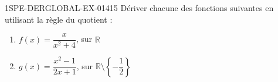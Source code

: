 \begin{exercice}{1SPE-DERGLOBAL-EX-014}{1}{5}
Dériver chacune des fonctions suivantes en utilisant la règle du quotient :
\begin{enumerate}
  \item $f(x) = \dfrac{x}{x^2+4}$, sur $\mathbb{R}$
  \item $g(x) = \dfrac{x^2-1}{2x+1}$, sur $\mathbb{R} \setminus \left\{-\dfrac{1}{2}\right\}$
\end{enumerate}
\end{exercice}
